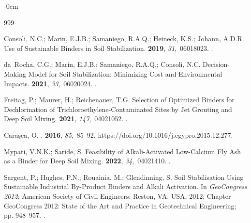 \documentclass[constrmater,article,accept,pdftex,moreauthors]{Definitions/mdpi}
\begin{document}
\begin{adjustwidth}{-\extralength}{0cm}


%
\begin{thebibliography}{999}

Consoli, N.C.; Marin, E.J.B.; Samaniego, R.A.Q.; Heineck, K.S.; Johann, A.D.R.
\newblock Use of Sustainable Binders in Soil Stabilization.
 {\bf 2019}, {\em
  31},~06018023.
.

da~Rocha, C.G.; Marin, E.J.B.; Samaniego, R.A.Q.; Consoli, N.C.
\newblock Decision-Making Model for Soil Stabilization: Minimizing Cost and
  Environmental Impacts.
 {\bf 2021}, {\em
  33},~06020024.
.

Freitag, P.; Maurer, H.; Reichenauer, T.G.
\newblock Selection of Optimized Binders for Dechlorination of
  Trichloroethylene-Contaminated Sites by Jet Grouting and Deep Soil Mixing.
 {\bf 2021}, {\em
  147},~04021052.
.

Caraşca, O.
.
 {\bf 2016}, {\em 85},~85--92.
\newblock https://doi.org/10.1016/\linebreak j.egypro.2015.12.277.

Mypati, V.N.K.; Saride, S.
\newblock Feasibility of Alkali-Activated Low-Calcium Fly Ash as a Binder for
  Deep Soil Mixing.
 {\bf 2022}, {\em
  34},~04021410.
.

Sargent, P.; Hughes, P.N.; Rouainia, M.; Glendinning, S. Soil Stabilisation
  Using Sustainable Industrial By-Product Binders and Alkali Activation.
\newblock In {\em GeoCongress 2012}; American Society of Civil Engineers: Reston, VA, USA,
  2012; Chapter {GeoCongress 2012: State of the Art and Practice in
  Geotechnical Engineering}; pp. 948--957.
.


\end{thebibliography}
\end{adjustwidth}
\end{document}
